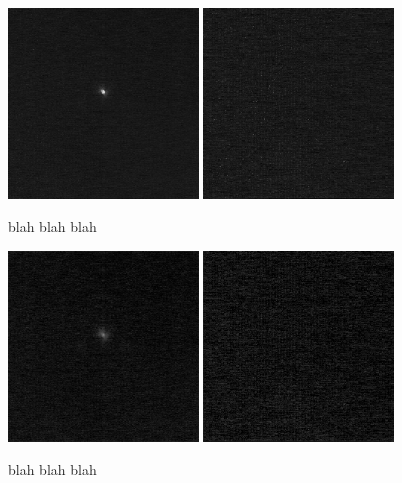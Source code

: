 \documentclass[12pt]{article}
\begin{document}
\newpage
\begin{figure}[H]
\centering
\includegraphics[width=0.45\textwidth]{image.jpg}
\includegraphics[width=0.45\textwidth]{corner.jpg}
\vspace{-0.75em}
\caption{blah blah blah}
\end{figure}
\begin{figure}[H]
\centering
\includegraphics[width=0.45\textwidth]{image_root.png}
\includegraphics[width=0.45\textwidth]{corner_root.png}
\vspace{-0.75em}
\caption{blah blah blah}
\end{figure}
\end{document}
